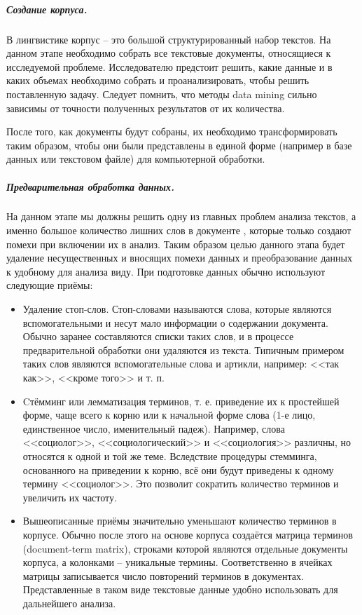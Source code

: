 	\subparagraph{Создание корпуса.} В лингвистике корпус -- это большой структурированный набор текстов. На данном этапе необходимо собрать все текстовые документы, относящиеся к исследуемой проблеме. Исследователю предстоит решить, какие данные и в каких объемах необходимо собрать и проанализировать, чтобы решить поставленную задачу. Следует помнить, что методы data mining сильно зависимы от точности полученных результатов от их количества.
	
	После того, как документы будут собраны, их необходимо трансформировать таким образом, чтобы они были представлены в единой форме (например в базе данных или текстовом файле) для компьютерной обработки.
	
	\subparagraph{Предварительная обработка данных.} На данном этапе мы должны решить одну из главных проблем анализа текстов, а именно большое количество лишних слов в документе \cite[стр. 213]{bargesyan2009}, которые только создают помехи при включении их в анализ. Таким образом целью данного этапа будет удаление несущественных и вносящих помехи данных и преобразование данных к удобному для анализа виду. При подготовке данных обычно используют следующие приёмы:
	
	\begin{itemize}
	
	\item Удаление стоп-слов. Стоп-словами называются слова, которые являются вспомогательными и несут мало информации о содержании документа. Обычно заранее составляются списки таких слов, и в процессе предварительной обработки они удаляются из текста. Типичным примером таких слов являются вспомогательные слова и артикли, например: <<так как>>, <<кроме того>> и т. п.
	
	\item Cтёмминг или лемматизация терминов, т. е. приведение их к простейшей форме, чаще всего к корню или к начальной форме слова (1-е лицо, единственное число, именительный падеж). Например, слова <<социолог>>, <<социологический>> и <<социология>> различны, но относятся к одной и той же теме. Вследствие процедуры стемминга, основанного на приведении к корню, всё они будут приведены к одному термину <<социолог>>. Это позволит сократить количество терминов и увеличить их частоту.
	
	\item Вышеописанные приёмы значительно уменьшают количество терминов в корпусе. Обычно после этого на основе корпуса создаётся матрица терминов (document-term matrix), строками которой являются отдельные документы корпуса, а колонками -- уникальные термины. Соответственно в ячейках матрицы записывается число повторений терминов в документах. Представленные в таком виде текстовые данные удобно использовать для дальнейшего анализа.

	\end{itemize}

